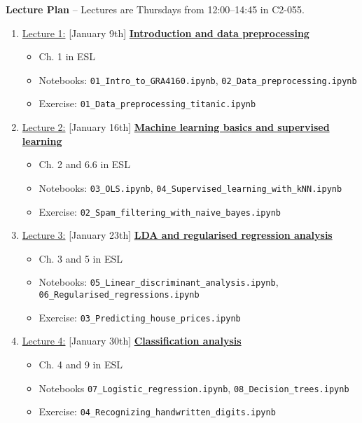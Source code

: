\documentclass[12pt, a4paper]{article}
\begin{document}
\newpage
\noindent\textbf{\large Lecture Plan}
-- Lectures are Thursdays from 12:00--14:45 in C2-055. \\
\begin{enumerate}
  \item[] \underline{Lecture 1:} [January 9th] \underline{\bf Introduction and data preprocessing}
    {\small
      \begin{itemize}
        \item Ch. 1 in ESL
        \item Notebooks: \texttt{01\_Intro\_to\_GRA4160.ipynb}, \texttt{02\_Data\_preprocessing.ipynb}
        \item Exercise: \texttt{01\_Data\_preprocessing\_titanic.ipynb}
      \end{itemize}
    }
  \item[] \underline{Lecture 2:} [January 16th] \underline{\bf Machine learning basics and supervised learning}
    {\small
      \begin{itemize}
        \item Ch. 2 and 6.6 in ESL
        \item Notebooks: \texttt{03\_OLS.ipynb}, \texttt{04\_Supervised\_learning\_with\_kNN.ipynb}
        \item Exercise: \texttt{02\_Spam\_filtering\_with\_naive\_bayes.ipynb}
      \end{itemize}
    }
  \item[] \underline{Lecture 3:} [January 23th] \underline{\bf LDA and regularised regression analysis}
    {\small
      \begin{itemize}
        \item Ch. 3 and 5 in ESL
        \item Notebooks: \texttt{05\_Linear\_discriminant\_analysis.ipynb}, \texttt{06\_Regularised\_regressions.ipynb}
        \item Exercise: \texttt{03\_Predicting\_house\_prices.ipynb}
      \end{itemize}
    }
\item [] \underline{Lecture 4:} [January 30th] \underline{\bf Classification analysis}
        {\small
          \begin{itemize}
            \item Ch. 4 and 9 in ESL
            \item Notebooks \texttt{07\_Logistic\_regression.ipynb}, \texttt{08\_Decision\_trees.ipynb}
            \item Exercise: \texttt{04\_Recognizing\_handwritten\_digits.ipynb}

\end{itemize}}
\end{enumerate}
\end{document}
